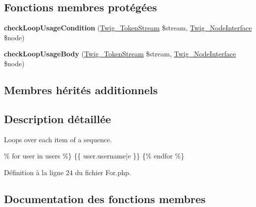 \subsection*{Fonctions membres protégées}
\begin{DoxyCompactItemize}
\item 
{\bfseries check\+Loop\+Usage\+Condition} (\hyperlink{class_twig___token_stream}{Twig\+\_\+\+Token\+Stream} \$stream, \hyperlink{interface_twig___node_interface}{Twig\+\_\+\+Node\+Interface} \$node)\hypertarget{class_twig___token_parser___for_a6f6d691fab820b69b3c6b181ba234b86}{}\label{class_twig___token_parser___for_a6f6d691fab820b69b3c6b181ba234b86}

\item 
{\bfseries check\+Loop\+Usage\+Body} (\hyperlink{class_twig___token_stream}{Twig\+\_\+\+Token\+Stream} \$stream, \hyperlink{interface_twig___node_interface}{Twig\+\_\+\+Node\+Interface} \$node)\hypertarget{class_twig___token_parser___for_ab992fbd424a4b456b999d5762da72276}{}\label{class_twig___token_parser___for_ab992fbd424a4b456b999d5762da72276}

\end{DoxyCompactItemize}
\subsection*{Membres hérités additionnels}


\subsection{Description détaillée}
Loops over each item of a sequence.


\begin{DoxyPre}

\begin{DoxyItemize}
\item 
\end{DoxyItemize}\% for user in users \%\}
   \{\{ user.username|e \}\}
 \{\% endfor \%\}

\end{DoxyPre}
 

Définition à la ligne 24 du fichier For.\+php.



\subsection{Documentation des fonctions membres}
